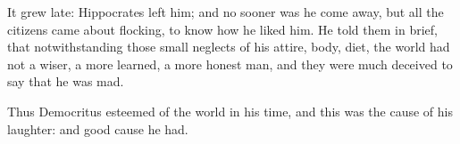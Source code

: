It grew late: Hippocrates left him; and no sooner was he come away, but all the
citizens came about flocking, to know how he liked him. He told them in brief,
that notwithstanding those small neglects of his attire, body, diet,
the world had not a wiser, a more learned, a more honest
man, and they were much deceived to say that he was mad.

Thus Democritus esteemed of the world in his time, and this was the cause of
his laughter: and good cause he had.

%

